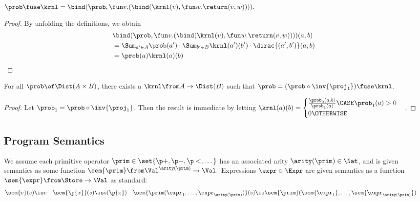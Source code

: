 \begin{proposition}
  $
    \prob\fuse\krnl =
    \bind(\prob,\fun v.(\bind(\krnl(v), \fun w.\return(v,w)))).
  $
\end{proposition}

\begin{proof}
  By unfolding the definitions, we obtain
  \begin{align*}
    &\bind(\prob,\fun v.(\bind(\krnl(v), \fun w.\return(v,w))))(a,b)
    \\
    &=
    \Sum_{a'\in A}
      \prob(a') \cdot
      \Sum_{b'\in B}
        \krnl(a')(b')\cdot\dirac{(a',b')}(a,b)
    \\&= \prob(a)\krnl(a)(b)
    \qedhere
  \end{align*}
\end{proof}

\begin{lemma}\label{lm:fuse-split}
  For all $\prob \of \Dist(A\times B)$,
  there exists a $\krnl \from A \to \Dist(B)$
  such that
  $ \prob = (\prob \circ \inv{\proj_1})\fuse\krnl $.
\end{lemma}

\begin{proof}
  Let $\prob_1 = \prob \circ \inv{\proj_1}$.
  Then the result is immediate by letting
  $
    \krnl(a)(b) =
      \begin{cases}
        \frac{\prob_0(a,b)}{\prob_1(a)}
          \CASE \prob_1(a) > 0
        \\
        0 \OTHERWISE
      \end{cases}
  $.
\end{proof}

\subsection{Program Semantics}

We assume each primitive operator $\prim \in \set{\p+,\p-,\p<,\dots}$
has an associated arity $\arity(\prim) \in \Nat$, and
is given semantics as some function
$ \sem{\prim} \from \Val^{\arity(\prim)} \to \Val. $
Expressions $\expr \in \Expr$ are given semantics as a function
$ \sem{\expr} \from \Store \to \Val $
as standard:
\begin{align*}
  \sem{v}(s) &\is v
  &
  \sem{\p{x}}(s) &\is s(\p{x})
  &
  \sem{\prim(\expr_1,\dots,\expr_{\arity(\prim)})}(s) &\is
    \sem{\prim}(\sem{\expr_1},\dots,\sem{\expr_{\arity(\prim)}})
\end{align*}

